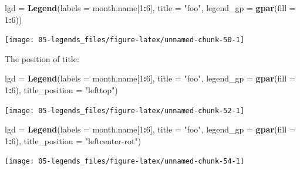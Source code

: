 \documentclass[]{book}
\newenvironment{Shaded}{\begin{snugshade}}{\end{snugshade}}
\newcommand{\KeywordTok}[1]{\textcolor[rgb]{0.13,0.29,0.53}{\textbf{#1}}}
\newcommand{\DataTypeTok}[1]{\textcolor[rgb]{0.13,0.29,0.53}{#1}}
\newcommand{\DecValTok}[1]{\textcolor[rgb]{0.00,0.00,0.81}{#1}}
\newcommand{\StringTok}[1]{\textcolor[rgb]{0.31,0.60,0.02}{#1}}
\newcommand{\OperatorTok}[1]{\textcolor[rgb]{0.81,0.36,0.00}{\textbf{#1}}}
\newcommand{\NormalTok}[1]{#1}
\theoremstyle{definition}
\theoremstyle{definition}
\theoremstyle{definition}
\theoremstyle{remark}
\begin{document}
\begin{Shaded}
\begin{Highlighting}[]
\NormalTok{lgd =}\StringTok{ }\KeywordTok{Legend}\NormalTok{(}\DataTypeTok{labels =}\NormalTok{ month.name[}\DecValTok{1}\OperatorTok{:}\DecValTok{6}\NormalTok{], }\DataTypeTok{title =} \StringTok{"foo"}\NormalTok{, }\DataTypeTok{legend_gp =} \KeywordTok{gpar}\NormalTok{(}\DataTypeTok{fill =} \DecValTok{1}\OperatorTok{:}\DecValTok{6}\NormalTok{))}
\end{Highlighting}
\end{Shaded}

\begin{center}\texttt{[image: 05-legends\_files/figure-latex/unnamed-chunk-50-1]} \end{center}

The position of title:

\begin{Shaded}
\begin{Highlighting}[]
\NormalTok{lgd =}\StringTok{ }\KeywordTok{Legend}\NormalTok{(}\DataTypeTok{labels =}\NormalTok{ month.name[}\DecValTok{1}\OperatorTok{:}\DecValTok{6}\NormalTok{], }\DataTypeTok{title =} \StringTok{"foo"}\NormalTok{, }\DataTypeTok{legend_gp =} \KeywordTok{gpar}\NormalTok{(}\DataTypeTok{fill =} \DecValTok{1}\OperatorTok{:}\DecValTok{6}\NormalTok{),}
    \DataTypeTok{title_position =} \StringTok{"lefttop"}\NormalTok{)}
\end{Highlighting}
\end{Shaded}

\begin{center}\texttt{[image: 05-legends\_files/figure-latex/unnamed-chunk-52-1]} \end{center}

\begin{Shaded}
\begin{Highlighting}[]
\NormalTok{lgd =}\StringTok{ }\KeywordTok{Legend}\NormalTok{(}\DataTypeTok{labels =}\NormalTok{ month.name[}\DecValTok{1}\OperatorTok{:}\DecValTok{6}\NormalTok{], }\DataTypeTok{title =} \StringTok{"foo"}\NormalTok{, }\DataTypeTok{legend_gp =} \KeywordTok{gpar}\NormalTok{(}\DataTypeTok{fill =} \DecValTok{1}\OperatorTok{:}\DecValTok{6}\NormalTok{),}
    \DataTypeTok{title_position =} \StringTok{"leftcenter-rot"}\NormalTok{)}
\end{Highlighting}
\end{Shaded}

\begin{center}\texttt{[image: 05-legends\_files/figure-latex/unnamed-chunk-54-1]} \end{center}
\end{document}
